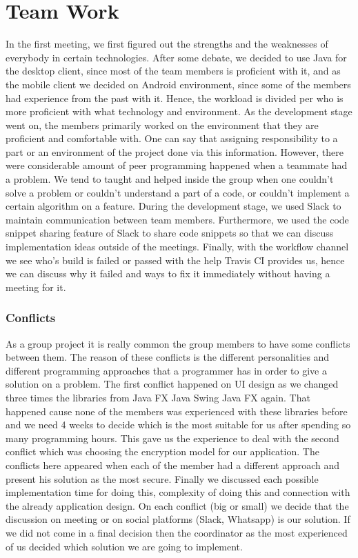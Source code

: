 \documentclass[11pt,a4paper]{report}
\begin{document}
\chapter{Team Work}
In the first meeting, we first figured out the strengths and the weaknesses of everybody in certain technologies. After some debate, we decided to use Java for the desktop client, since most of the team members is proficient with it, and as the mobile client we decided on Android environment, since some of the members had experience from the past with it. Hence, the workload is divided per who is more proficient with what technology and environment.
As the development stage went on, the members primarily worked on the environment that they are proficient and comfortable with. One can say that assigning responsibility to a part or an environment of the project done via this information. However, there were considerable amount of peer programming happened when a teammate had a problem. We tend to taught and helped inside the group when one couldn’t solve a problem or couldn’t understand a part of a code, or couldn’t implement a certain algorithm on a feature.
During the development stage, we used Slack to maintain communication between team members. Furthermore, we used the code snippet sharing feature of Slack to share code snippets so that we can discuss implementation ideas outside of the meetings. Finally, with the workflow channel we see who’s build is failed or passed with the help Travis CI provides us, hence we can discuss why it failed and ways to fix it immediately without having a meeting for it.

\subsection{Conflicts}
As a group project it is really common the group members to have some conflicts between them. The reason of these conflicts is the different personalities and different programming approaches that a programmer has in order to give a solution on a problem. The first conflict happened on UI design as we changed three times the libraries from Java FX \textrightarrow{} Java Swing \textrightarrow{} Java FX again. That happened cause none of the members was experienced with these libraries before and we need 4 weeks to decide which is the most suitable for us after spending so many programming hours. This gave us the experience to deal with the second conflict which was choosing the encryption model for our application. The conflicts here appeared when each of the member had a different approach and present his solution as the most secure. Finally we discussed each possible implementation time for doing this, complexity of doing this and connection with the already application design. On each conflict (big or small) we decide that the discussion on meeting or on social platforms (Slack, Whatsapp) is our solution. If we did not come in a final decision then the coordinator as the most experienced of us decided which solution we are going to implement.
\end{document}
